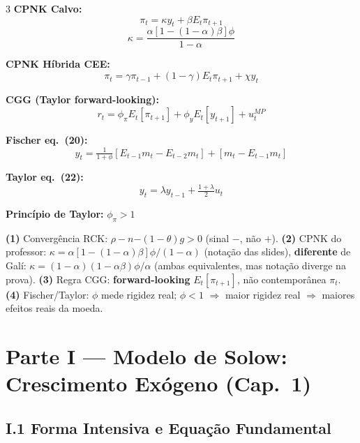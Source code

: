 \documentclass[12pt, a4paper]{article}
\begin{document}
\begin{multicols}{3}
\textbf{CPNK Calvo:}
\[
\pi_t = \kappa y_t + \beta E_t\pi_{t+1}
\]
\[
\kappa = \frac{\alpha[1-(1-\alpha)\beta]\phi}{1-\alpha}
\]

\textbf{CPNK Híbrida CEE:}
\[
\pi_t = \gamma\pi_{t-1} + (1-\gamma)E_t\pi_{t+1} + \chi y_t
\]

\textbf{CGG (Taylor forward-looking):}
\[
r_t = \phi_\pi E_t[\pi_{t+1}] + \phi_y E_t[y_{t+1}] + u_t^{MP}
\]

\textbf{Fischer eq.\ (20):}
\[
y_t = \tfrac{1}{1+\phi}[E_{t-1}m_t - E_{t-2}m_t] + [m_t - E_{t-1}m_t]
\]

\textbf{Taylor eq.\ (22):}
\[
y_t = \lambda y_{t-1} + \tfrac{1+\lambda}{2}u_t
\]

\textbf{Princípio de Taylor:} $\phi_\pi > 1$

\end{multicols}

\vspace{0.5em}
\begin{provabox}[title={Alertas Críticos da Prova}]
\textbf{(1)} Convergência RCK: $\rho - n \mathbf{-} (1-\theta)g > 0$ (sinal $\mathbf{-}$, não $+$).
\textbf{(2)} CPNK do professor: $\kappa = \alpha[1-(1-\alpha)\beta]\phi/(1-\alpha)$ (notação das slides), \textbf{diferente} de Galí: $\kappa = (1-\alpha)(1-\alpha\beta)\phi/\alpha$ (ambas equivalentes, mas notação diverge na prova).
\textbf{(3)} Regra CGG: \textbf{forward-looking} $E_t[\pi_{t+1}]$, não contemporânea $\pi_t$.
\textbf{(4)} Fischer/Taylor: $\phi$ mede rigidez real; $\phi<1$ $\Rightarrow$ maior rigidez real $\Rightarrow$ maiores efeitos reais da moeda.
\end{provabox}

\newpage
\tableofcontents
\newpage

\section*{\large\color{cyanrbc} Parte I --- Modelo de Solow: Crescimento Exógeno (Cap.\ 1)}

\subsection*{I.1 Forma Intensiva e Equação Fundamental}
\end{document}
